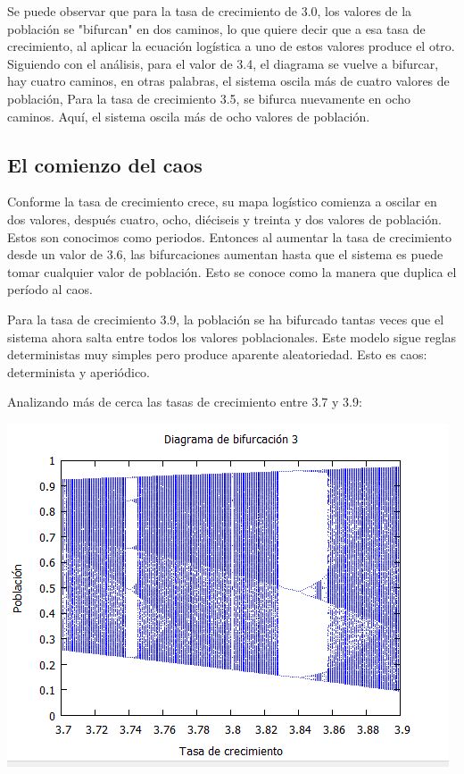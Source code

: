 \documentclass{article}
\begin{document}
Se puede observar que para la tasa de crecimiento de 3.0, los valores de la población se "bifurcan" en dos caminos, lo que quiere decir que a esa tasa de crecimiento, al aplicar la ecuación logística a uno de estos valores produce el otro. Siguiendo con el análisis, para el valor de 3.4, el diagrama se vuelve a bifurcar, hay cuatro caminos, en otras palabras, el sistema oscila más de cuatro valores de población, Para la tasa de crecimiento 3.5, se bifurca nuevamente en ocho caminos. Aquí, el sistema oscila más de ocho valores de población.

\subsection{El comienzo del caos}

Conforme la tasa de crecimiento crece, su mapa logístico comienza a oscilar en dos valores, después cuatro, ocho, diéciseis y treinta y dos valores de población. Estos son conocimos como periodos. Entonces al aumentar la tasa de crecimiento desde un valor de 3.6, las bifurcaciones aumentan hasta que el sistema es puede tomar cualquier valor de población. Esto se conoce como la manera que duplica el período al caos.

Para la tasa de crecimiento 3.9, la población se ha bifurcado tantas veces que el sistema ahora salta entre todos los valores poblacionales. Este modelo sigue reglas deterministas muy simples pero produce aparente aleatoriedad. Esto es caos: determinista y aperiódico.

Analizando más de cerca las tasas de crecimiento entre 3.7 y 3.9:

\begin{center}
\includegraphics[width=.8\textwidth]{Imagen4.PNG}
\end{center}
\end{document}
